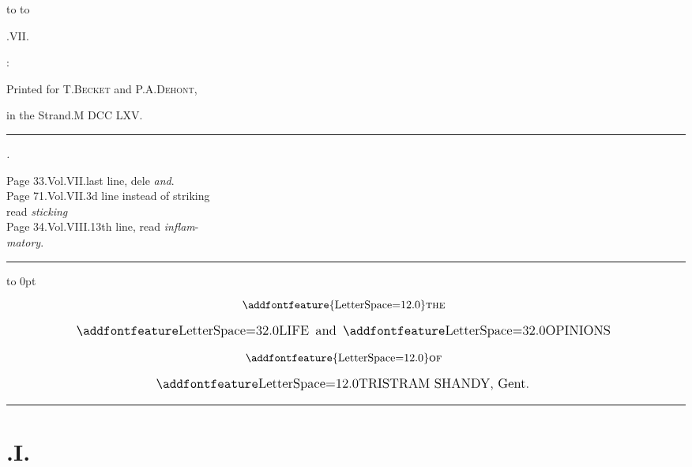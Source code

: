 \documentclass{article}
\begin{document}
\pagestyle{empty}
\centerline{\vbox{\openup 12pt}}
\vfill
\noindent
\hbox to 
\hbox to 
\vfill
\centerline{.\quad VII.}
\vfill
\centerline{:}
\centerline{\small Printed for T.\@ \textsc{Becket} and P.\@ A.\@  \textsc{Dehont},\rlap{\quad\club}}
\centerline{\small in the Strand.\quad M DCC LXV.}

\newpage\null
\vfill
\bgroup\small
\hrule
\bigskip

\centerline{\itshape{}.}

\noindent
Page 33.\@ Vol.\@ VII.\@ last line, dele \textit{and}.\\[2pt]
Page 71.\@ Vol.\@ VII.\@ 3d line instead of striking\\[2pt]
\null\quad read \textit{sticking}\\[2pt]
Page 34.\@ Vol.\@ VIII.\@ 13th line, read \textit{inflam}-\\[2pt]
\null\quad \textit{matory}.

\bigskip
\hrule
\egroup
\vfill
\newpage
\pagestyle{fancy}
\thispagestyle{empty}
\setcounter{page}{1}
\hbox{}\vskip -36pt
\moveright 88pt\vbox to 0pt{\hsize
40pt\vss}

\[\vbox{\openup 12pt\halign{\hss # \hss\cr
\addfontfeature{LetterSpace=12.0}\textsc{the}\cr
\large \lsss{LIFE}\enspace and\enspace \lsss{OPINIONS}\cr
\addfontfeature{LetterSpace=12.0}\textsc{of}\cr
\large \ls{TRISTRAM SHANDY}, Gent.\cr}}\]

\vskip 12pt
\hrule

\setlength{\baselineskip}{14pt}  %
\sloppy





\section{.\enspace I.}
\end{document}
